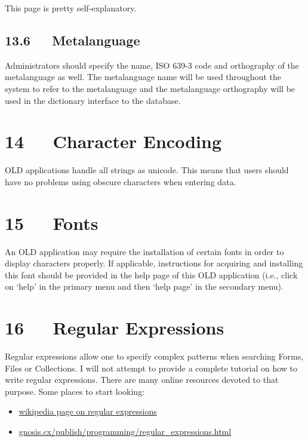 \documentclass[letterpaper,10pt,english]{sphinxmanual}
\begin{document}
This page is pretty self-explanatory.


\section{13.6   Metalanguage}
\label{documentation:metalanguage}
Administrators should specify the name, ISO 639-3 code and orthography of the
metalanguage as well.  The metalanguage name will be used throughout the system
to refer to the metalanguage and the metalanguage orthography will be used in
the dictionary interface to the database.


\chapter{14   Character Encoding}
\label{documentation:character-encoding}
OLD applications handle all strings as unicode.  This means that users should
have no problems using obscure characters when entering data.


\chapter{15   Fonts}
\label{documentation:fonts}
An OLD application may require the installation of certain fonts in order to
display characters properly.  If applicable, instructions for acquiring and
installing this font should be provided in the help page of this OLD
application (i.e., click on `help' in the primary menu and then `help page' in
the secondary menu).


\chapter{16   Regular Expressions}
\label{documentation:regular-expressions}
Regular expressions allow one to specify complex patterns when searching Forms,
Files or Collections.  I will not attempt to provide a complete tutorial on how
to write regular expressions.  There are many online resources devoted to that
purpose.  Some places to start looking:
\begin{itemize}
\item {} 
\href{http://en.wikipedia.org/wiki/Regular\_expression}{wikipedia page on regular expressions}

\item {} 
\href{http://gnosis.cx/publish/programming/regular\_expressions.html}{gnosis.cx/publish/programming/regular\_expressions.html}

\end{itemize}
\end{document}
